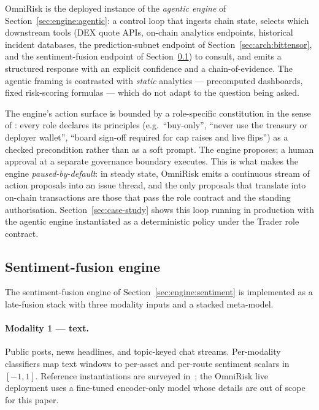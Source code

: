 \documentclass[11pt,a4paper]{article}
\begin{document}
OmniRisk is the deployed instance of the \emph{agentic engine} of
Section~\ref{sec:engine:agentic}: a control loop that ingests chain state, selects which
downstream tools (DEX quote APIs, on-chain analytics endpoints, historical incident
databases, the prediction-subnet endpoint of Section~\ref{sec:arch:bittensor}, and the
sentiment-fusion endpoint of Section~\ref{sec:arch:sentiment}) to consult, and emits a
structured response with an explicit confidence and a chain-of-evidence. The agentic
framing is contrasted with \emph{static} analytics --- precomputed dashboards, fixed
risk-scoring formulas --- which do not adapt to the question being asked.

The engine's action surface is bounded by a role-specific constitution in the sense of
\cite{bai2022constitutional}: every role declares its principles (e.g.\ ``buy-only'',
``never use the treasury or deployer wallet'', ``board sign-off required for cap raises
and live flips'') as a checked precondition rather than as a soft prompt. The engine
proposes; a human approval at a separate governance boundary executes. This is what
makes the engine \emph{paused-by-default}: in steady state, OmniRisk emits a continuous
stream of action proposals into an issue thread, and the only proposals that translate
into on-chain transactions are those that pass the role contract and the standing
authorisation. Section~\ref{sec:case-study} shows this loop running in production with
the agentic engine instantiated as a deterministic policy under the Trader role
contract.

\subsection{Sentiment-fusion engine}\label{sec:arch:sentiment}

The sentiment-fusion engine of Section~\ref{sec:engine:sentiment} is implemented as a
late-fusion stack with three modality inputs and a stacked meta-model.

\paragraph{Modality 1 --- text.} Public posts, news headlines, and topic-keyed chat
streams. Per-modality classifiers map text windows to per-asset and per-route sentiment
scalars in $[-1, 1]$. Reference instantiations are surveyed
in~\cite{schumaker2009textual,xing2018natural,day2016deep}; the OmniRisk live deployment
uses a fine-tuned encoder-only model whose details are out of scope for this paper.
\end{document}
